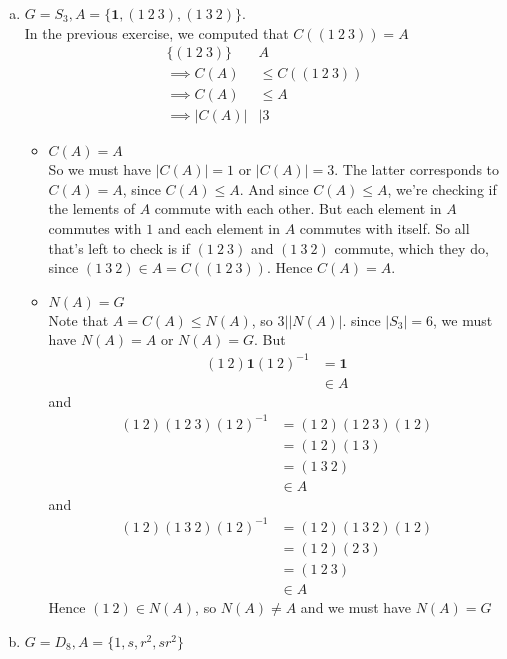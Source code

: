 \documentclass{article}
\newcommand{\set}[1]{ \{ #1 \} }
\newcommand{\inv}[1]{ {#1}^{-1} }
\newcommand{\id}{ \bm{1} }
\newcommand{\norm}[1]{|#1|}
\newcommand{\divides}{\vert}
\begin{document}
\subsubsection{}\label{ex2p5}
\begin{enumerate}[(a)]
\item $G=S_3, A=\set{\id, (1\ 2\ 3), (1\ 3\ 2)}$.\\
In the previous exercise, we computed that $C( (1\ 2\ 3) ) = A$
\begin{align*}
\set{(1\ 2\ 3)} & A\\
\implies C(A) &\leq C( (1\ 2\ 3) )\\
\implies C(A) &\leq A\\
\implies \norm{C(A)} &\divides 3
\end{align*}
\begin{itemize}
\item $C(A)=A$\\
So we must have $\norm{C(A)}=1$ or $\norm{C(A)} = 3$. The latter corresponds to $C(A) = A$, since $C(A) \leq A$. And since $C(A) \leq A$, we're checking if the lements of $A$ commute with each other. But each element in $A$ commutes with $1$ and each element in $A$ commutes with itself. So all that's left to check is if $(1\ 2\ 3)$ and $(1\ 3\ 2)$ commute, which they do, since $(1\ 3\ 2) \in A = C( (1\ 2\ 3) )$. Hence $C(A) = A$.
\item $N(A)=G$\\
Note that $A=C(A) \leq N(A)$, so $3 \divides \norm{N(A)}$. since $\norm{S_3} = 6$, we must have $N(A)=A$ or $N(A)=G$. But
\begin{align*}
(1\ 2)\id\inv{(1\ 2)} &= \id\\
&\in A
\end{align*}
and
\begin{align*}
(1\ 2)(1\ 2\ 3)\inv{(1\ 2)} &= (1\ 2)(1\ 2\ 3)(1\ 2)\\
&= (1\ 2)(1\ 3)\\
&= (1\ 3\ 2)\\
&\in A
\end{align*}
and
\begin{align*}
(1\ 2)(1\ 3\ 2)\inv{(1\ 2)} &= (1\ 2)(1\ 3\ 2)(1\ 2)\\
&= (1\ 2)(2\ 3)\\
&= (1\ 2\ 3)\\
&\in A
\end{align*}
Hence $(1\ 2) \in N(A)$, so $N(A) \neq A$ and we must have $N(A) = G$
\end{itemize}
\item $G=D_8, A=\set{1,s,r^2,sr^2}$\\

\end{enumerate}
\end{document}
